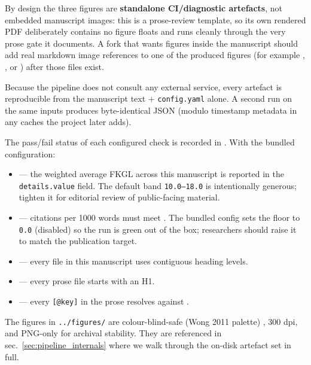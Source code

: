 \documentclass[
]{article}
\providecommand{\tightlist}{%
  \setlength{\itemsep}{0pt}\setlength{\parskip}{0pt}}
\begin{document}
By design the three figures are \textbf{standalone CI/diagnostic
artefacts}, not embedded manuscript images: this is a prose-review
template, so its own rendered PDF deliberately contains no figure floats
and runs cleanly through the very prose gate it documents. A fork that
wants figures inside the manuscript should add real markdown image
references to one of the produced figures (for example
,
, or
) after those files exist.

Because the pipeline does not consult any external service, every
artefact is reproducible from the manuscript text + \texttt{config.yaml}
alone. A second run on the same inputs produces byte-identical JSON
(modulo timestamp metadata in any caches the project later adds).

The pass/fail status of each configured check is recorded in
. With the bundled configuration:

\begin{itemize}
\tightlist
\item
  \textbf{} --- the weighted average FKGL
  across this manuscript is reported in the 
  \texttt{details.value} field. The default band \texttt{10.0–18.0} is
  intentionally generous; tighten it for editorial review of
  public-facing material.
\item
  \textbf{} --- citations per
  1000 words must meet .
  The bundled config sets the floor to \texttt{0.0} (disabled) so the
  run is green out of the box; researchers should raise it to match the
  publication target.
\item
  \textbf{} --- every file in this
  manuscript uses contiguous heading levels.
\item
  \textbf{} --- every prose file starts
  with an H1.
\item
  \textbf{} --- every
  \texttt{{[}@key{]}} in the prose resolves against
  .
\end{itemize}

The figures in \texttt{../figures/} are colour-blind-safe (Wong 2011
palette) \citep{wong2011points}, 300 dpi, and PNG-only for archival
stability. They are referenced in sec.~\ref{sec:pipeline_internals}
where we walk through the on-disk artefact set in full.
\end{document}
